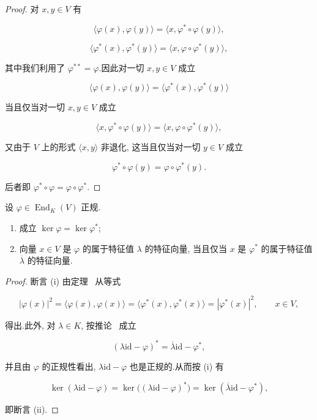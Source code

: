 \begin{proof}
对 $x, y \in V$ 有

\[
\bigl\langle \varphi(x), \varphi(y) \bigr\rangle = \bigl\langle x, \varphi^* \circ \varphi(y) \bigr\rangle,
\]

\[
\bigl\langle \varphi^*(x), \varphi^*(y) \bigr\rangle = \bigl\langle x, \varphi \circ \varphi^*(y) \bigr\rangle,
\]

其中我们利用了 $\varphi^{**} = \varphi$.因此对一切 $x, y \in V$ 成立

\[
\bigl\langle \varphi(x), \varphi(y) \bigr\rangle = \bigl\langle \varphi^*(x), \varphi^*(y) \bigr\rangle
\]

当且仅当对一切 $x, y \in V$ 成立

\[
\bigl\langle x, \varphi^* \circ \varphi(y) \bigr\rangle = \bigl\langle x, \varphi \circ \varphi^*(y) \bigr\rangle,
\]

又由于 $V$ 上的形式 $\langle x, y \rangle$ 非退化, 这当且仅当对一切 $y \in V$ 成立

\[
\varphi^* \circ \varphi(y) = \varphi \circ \varphi^*(y)\text{.}
\]

后者即 $\varphi^* \circ \varphi = \varphi \circ \varphi^*$.
\end{proof}

\begin{corollary}\label{cor:7.4.7}
设 $\varphi \in \operatorname{End}_K(V)$ 正规.
\begin{enumerate}
\item[(i)] 成立 $\ker \varphi = \ker \varphi^*$;
\item[(ii)] 向量 $x \in V$ 是 $\varphi$ 的属于特征值 $\lambda$ 的特征向量, 当且仅当 $x$ 是 $\varphi^*$ 的属于特征值 $\overline{\lambda}$ 的特征向量.
\end{enumerate}
\end{corollary}

\begin{proof}
断言 (i) 由定理~ 从等式

\[
|\varphi(x)|^2 = \bigl\langle \varphi(x), \varphi(x) \bigr\rangle = \bigl\langle \varphi^*(x), \varphi^*(x) \bigr\rangle = |\varphi^*(x)|^2, \qquad x \in V,
\]

得出.此外, 对 $\lambda \in K$, 按推论~ 成立

\[
(\lambda \mathrm{id} - \varphi)^* = \overline{\lambda} \mathrm{id} - \varphi^*,
\]

并且由 $\varphi$ 的正规性看出, $\lambda \mathrm{id} - \varphi$ 也是正规的.从而按 (i) 有

\[
\ker(\lambda \mathrm{id} - \varphi) = \ker\bigl((\lambda \mathrm{id} - \varphi)^*\bigr) = \ker(\overline{\lambda} \mathrm{id} - \varphi^*),
\]

即断言 (ii).
\end{proof}

